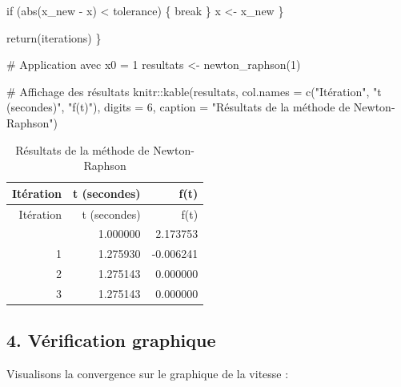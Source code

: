 \documentclass[
  12pt,
  letterpaper,
]{book}
\newenvironment{Shaded}{}{}
\newcommand{\AttributeTok}[1]{\textcolor[rgb]{0.84,0.23,0.29}{#1}}
\newcommand{\CommentTok}[1]{\textcolor[rgb]{0.42,0.45,0.49}{#1}}
\newcommand{\ControlFlowTok}[1]{\textcolor[rgb]{0.84,0.23,0.29}{#1}}
\newcommand{\DecValTok}[1]{\textcolor[rgb]{0.00,0.36,0.77}{#1}}
\newcommand{\FunctionTok}[1]{\textcolor[rgb]{0.44,0.26,0.76}{#1}}
\newcommand{\NormalTok}[1]{\textcolor[rgb]{0.14,0.16,0.18}{#1}}
\newcommand{\OtherTok}[1]{\textcolor[rgb]{0.44,0.26,0.76}{#1}}
\newcommand{\SpecialCharTok}[1]{\textcolor[rgb]{0.00,0.36,0.77}{#1}}
\newcommand{\StringTok}[1]{\textcolor[rgb]{0.01,0.18,0.38}{#1}}
\theoremstyle{remark}
\begin{document}
\begin{Shaded}
\begin{Highlighting}[]
    \ControlFlowTok{if}\NormalTok{ (}\FunctionTok{abs}\NormalTok{(x\_new }\SpecialCharTok{{-}}\NormalTok{ x) }\SpecialCharTok{\textless{}}\NormalTok{ tolerance) \{}
      \ControlFlowTok{break}
\NormalTok{    \}}
\NormalTok{    x }\OtherTok{\textless{}{-}}\NormalTok{ x\_new}
\NormalTok{  \}}
  
  \FunctionTok{return}\NormalTok{(iterations)}
\NormalTok{\}}

\CommentTok{\# Application avec x0 = 1}
\NormalTok{resultats }\OtherTok{\textless{}{-}} \FunctionTok{newton\_raphson}\NormalTok{(}\DecValTok{1}\NormalTok{)}

\CommentTok{\# Affichage des résultats}
\NormalTok{knitr}\SpecialCharTok{::}\FunctionTok{kable}\NormalTok{(resultats,}
             \AttributeTok{col.names =} \FunctionTok{c}\NormalTok{(}\StringTok{"Itération"}\NormalTok{, }\StringTok{"t (secondes)"}\NormalTok{, }\StringTok{"f(t)"}\NormalTok{),}
             \AttributeTok{digits =} \DecValTok{6}\NormalTok{,}
             \AttributeTok{caption =} \StringTok{"Résultats de la méthode de Newton{-}Raphson"}\NormalTok{)}
\end{Highlighting}
\end{Shaded}

\begin{longtable}[]{@{}rrr@{}}
\caption{Résultats de la méthode de Newton-Raphson}\tabularnewline
\toprule\noalign{}
Itération & t (secondes) & f(t) \\
\midrule\noalign{}
\endfirsthead
\toprule\noalign{}
Itération & t (secondes) & f(t) \\
\midrule\noalign{}
\endhead
\bottomrule\noalign{}
\endlastfoot
0 & 1.000000 & 2.173753 \\
1 & 1.275930 & -0.006241 \\
2 & 1.275143 & 0.000000 \\
3 & 1.275143 & 0.000000 \\
\end{longtable}

\hypertarget{vuxe9rification-graphique}{%
\subsection{4. Vérification graphique}\label{vuxe9rification-graphique}}

Visualisons la convergence sur le graphique de la vitesse :
\end{document}
